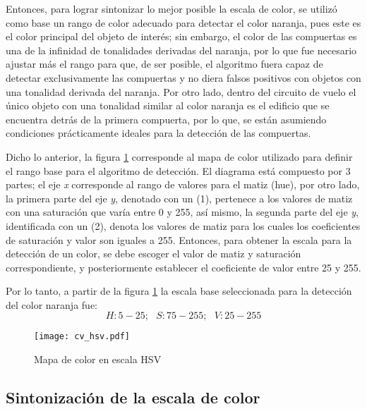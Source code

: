 Entonces, para lograr sintonizar lo mejor posible la escala de color, se utilizó como base un rango de color adecuado para detectar el color naranja, pues este es el color principal del objeto de interés; sin embargo, el color de las compuertas es una de la infinidad de tonalidades derivadas del naranja, por lo que fue necesario ajustar más el rango para que, de ser posible, el algoritmo fuera capaz de detectar exclusivamente las compuertas y no diera falsos positivos con objetos con una tonalidad derivada del naranja. Por otro lado, dentro del circuito de vuelo el único objeto con una tonalidad similar al color naranja es el edificio que se encuentra detrás de la primera compuerta, por lo que, se están asumiendo condiciones prácticamente ideales para la detección de las compuertas.

Dicho lo anterior, la figura \ref{fig:cv_hsv} corresponde al mapa de color utilizado para definir el rango base para el algoritmo de detección. El diagrama está compuesto por 3 partes; el eje \textit{x} corresponde al rango de valores para el matiz (hue), por otro lado, la primera parte del eje \textit{y}, denotado con un (1), pertenece a los valores de matiz con una saturación que varía entre 0 y 255, así mismo, la segunda parte del eje \textit{y}, identificada con un (2), denota los valores de matiz para los cuales los coeficientes de saturación y valor son iguales a 255. Entonces, para obtener la escala para la detección de un color, se debe escoger el valor de matiz y saturación correspondiente, y posteriormente establecer el coeficiente de valor entre 25 y 255.

Por lo tanto, a partir de la figura \ref{fig:cv_hsv} la escala base seleccionada para la detección del color naranja fue: \[H:5-25;\text{ } S:75-255;\text{ } V:25-255\]

\begin{figure}[ht]
    \centering
    \texttt{[image: cv\_hsv.pdf]}
    \caption{Mapa de color en escala HSV \cite{dey_2020}}
    \label{fig:cv_hsv}
\end{figure}

\subsection{Sintonización de la escala de color}

